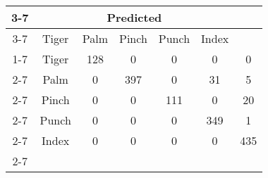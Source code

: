 \documentclass{standalone}
\begin{document}
 
 \begin{tabular}{|c |c |c |c |c |c |c |}
\cline{3-7}\multicolumn{2}{c|}{} & \multicolumn{5}{c|}{Predicted} \\ 
\cline{3-7} \multicolumn{2}{c |}{ } & Tiger & Palm & Pinch & Punch & Index\\ 
\cline{1-7}\multirow{5}{*}{\rotatebox[origin=c]{90}{Actual}} & Tiger & 128 & 0 & 0 & 0 & 0\\ 
 \cline{2-7} & Palm & 0 & 397 & 0 & 31 & 5\\ 
 \cline{2-7} & Pinch & 0 & 0 & 111 & 0 & 20\\ 
 \cline{2-7} & Punch & 0 & 0 & 0 & 349 & 1\\ 
 \cline{2-7} & Index & 0 & 0 & 0 & 0 & 435\\ 
 \cline{2-7}\hline \end{tabular}
 
\end{document}
